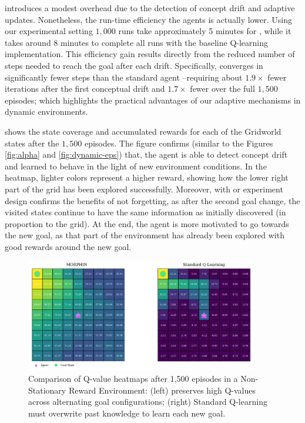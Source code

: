 \adaptiverl introduces a modest overhead due to the detection of concept drift and adaptive updates. 
Nonetheless, the run-time efficiency the agents is actually lower. Using our experimental setting 
$1,000$ runs take approximately 5 minutes for \adaptiverl, while it takes around 8 minutes to 
complete all runs with the baseline Q-learning implementation. This efficiency gain results directly 
from the reduced number of steps needed to reach the goal after each drift. Specifically, \adaptiverl 
converges in significantly fewer steps than the standard agent --requiring about $1.9\times$ fewer 
iterations after the first conceptual drift and $1.7\times$ fewer over the full $1,500$ episodes; which 
highlights the practical advantages of our adaptive mechanisms in dynamic environments.

 shows the state coverage and accumulated rewards for each of the Gridworld 
states after the $1,500$ episodes. The figure confirms (similar to the Figures \ref{fig:alpha} and 
\ref{fig:dynamic-eps}) that, the agent is able to detect concept drift and learned to behave in the light 
of new environment conditions. In the heatmap, lighter colors represent a higher reward, showing how 
the lower right part of the grid has been explored successfully. Moreover, with or experiment design 
confirms the benefits of not forgetting, as after the second goal change, the visited states continue to 
have the same information as initially discovered (in proportion to the grid). At the end, the agent is 
more motivated to go towards the new goal, as that part of the environment has already been 
explored with good rewards around the new goal.
 
\begin{figure}[hptb]
    \centering
    \includegraphics[width=0.9\textwidth]{figures/q_map_comp}
    \caption{Comparison of Q-value heatmaps after 1,500 episodes in a Non-Stationary Reward Environment: (left) \adaptiverl preserves high Q-values across alternating goal configurations; (right) Standard Q-learning must overwrite past knowledge to learn each new goal.}
    \label{fig:q-value-comp}
\end{figure}

